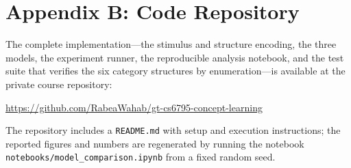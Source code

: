 \documentclass[conference]{IEEEtran}
\begin{document}
\section*{Appendix B: Code Repository}
The complete implementation---the stimulus and structure encoding, the three
models, the experiment runner, the reproducible analysis notebook, and the test
suite that verifies the six category structures by enumeration---is available at
the private course repository:
\begin{center}
\url{https://github.com/RabeaWahab/gt-cs6795-concept-learning}
\end{center}
The repository includes a \texttt{README.md} with setup and execution
instructions; the reported figures and numbers are regenerated by running the
notebook \texttt{notebooks/model\_comparison.ipynb} from a fixed random seed.
\end{document}
